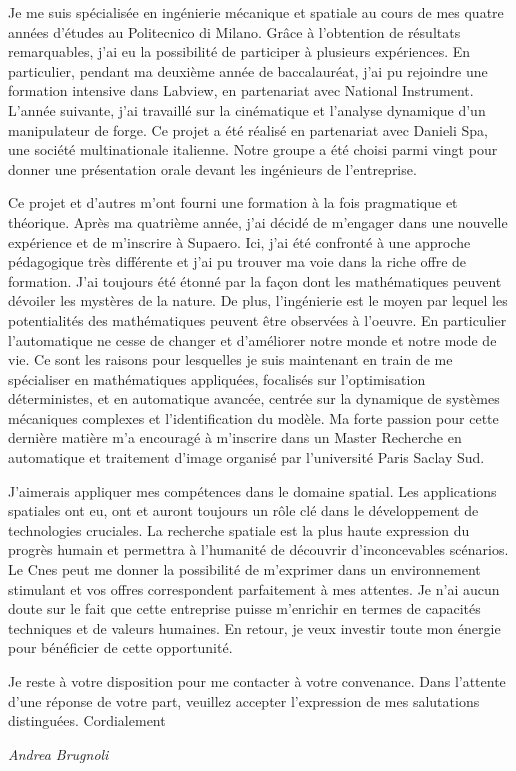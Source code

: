 \documentclass[11pt]{letter}
\begin{document}
Je me suis spécialisée en ingénierie mécanique et spatiale au cours de mes quatre années d'études au Politecnico di Milano. Grâce à l'obtention de résultats remarquables, j'ai eu la possibilité de participer à plusieurs expériences. En particulier, pendant ma deuxième année de baccalauréat, j'ai pu rejoindre une formation intensive dans Labview, en partenariat avec National Instrument. L'année suivante, j'ai travaillé sur la cinématique et l'analyse dynamique d'un manipulateur de forge. Ce projet a été réalisé en partenariat avec Danieli Spa, une société multinationale italienne. Notre groupe a été choisi parmi vingt pour donner une présentation orale devant les ingénieurs de l'entreprise.
\begin{comment}
J'ai spécialement apprécié de travailler sur un projet de transfert interplanétaire. Dans des missions spatiales complexes différentes disciplines doivent être intégrées et c'est la raison pour la quelle j'ai travaillé passionnément au projet. Plus tard, j'ai eu l'occasion de travailler sur la dynamique multi-corps dans l'environnement Simulink pour étudier les flexibilités des appendices au cours de manoeuvres de satellites.
\end{comment}
 Ce projet et d'autres m'ont fourni une formation à la fois pragmatique et théorique. Après ma quatrième année, j'ai décidé de m'engager dans une nouvelle expérience et de m'inscrire à Supaero. Ici, j'ai été confronté à une approche pédagogique très différente et j'ai pu trouver ma voie dans la riche offre de formation. J'ai toujours été étonné par la façon dont les mathématiques peuvent dévoiler les mystères de la nature. De plus, l'ingénierie est le moyen par lequel les potentialités des mathématiques peuvent être observées à l'oeuvre. En particulier l'automatique ne cesse de changer et d'améliorer notre monde et notre mode de vie. Ce sont les raisons pour lesquelles je suis maintenant en train de me spécialiser en mathématiques appliquées, focalisés sur l'optimisation déterministes,  et en automatique avancée, centrée sur la dynamique de systèmes mécaniques complexes et l'identification du modèle. Ma forte passion pour cette dernière matière m'a encouragé à m'inscrire dans un Master Recherche en automatique et traitement d'image organisé par l'université Paris Saclay Sud. 

J'aimerais appliquer mes compétences dans le domaine spatial. Les applications spatiales ont eu, ont et auront toujours un rôle clé dans le développement de technologies cruciales. La recherche spatiale est la plus haute expression du progrès humain et permettra à l'humanité de découvrir d'inconcevables scénarios. Le Cnes peut me donner la possibilité de m'exprimer dans un environnement stimulant et vos offres correspondent parfaitement à mes attentes. Je n'ai aucun doute sur le fait que cette entreprise puisse m'enrichir en termes de capacités techniques et de valeurs humaines. En retour, je veux investir toute mon énergie pour bénéficier de cette opportunité.

Je reste à votre disposition pour me contacter à votre convenance. Dans l'attente d'une réponse de votre part, veuillez accepter l'expression de mes salutations distinguées. Cordialement


 \begin{center}
 \large\textit{Andrea Brugnoli}
 \end{center}
 
\end{document}

